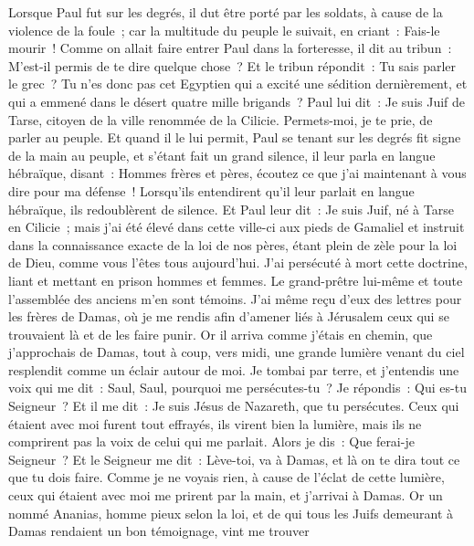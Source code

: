 \begin{multicols}{2}
Lorsque Paul fut sur les degrés, il dut être porté par les soldats, à cause de la violence de la foule~;
car la multitude du peuple le suivait, en criant~: Fais-le mourir~!
Comme on allait faire entrer Paul dans la forteresse, il dit au tribun~: M'est-il permis de te dire quelque chose~? Et le tribun répondit~: Tu sais parler le grec~?
Tu n'es donc pas cet Egyptien qui a excité une sédition dernièrement, et qui a emmené dans le désert quatre mille brigands~?
Paul lui dit~: Je suis Juif de Tarse, citoyen de la ville renommée de la Cilicie. Permets-moi, je te prie, de parler au peuple.
Et quand il le lui permit, Paul se tenant sur les degrés fit signe de la main au peuple, et s'étant fait un grand silence, il leur parla en langue hébraïque, disant~:
\VerseOne{}Hommes frères et pères, écoutez ce que j'ai maintenant à vous dire pour ma défense~!
Lorsqu'ils entendirent qu'il leur parlait en langue hébraïque, ils redoublèrent de silence. Et Paul leur dit~:
Je suis Juif, né à Tarse en Cilicie~; mais j'ai été élevé dans cette ville-ci aux pieds de Gamaliel et instruit dans la connaissance exacte de la loi de nos pères, étant plein de zèle pour la loi de Dieu, comme vous l'êtes tous aujourd'hui.
J'ai persécuté à mort cette doctrine, liant et mettant en prison hommes et femmes.
Le grand-prêtre lui-même et toute l'assemblée des anciens m'en sont témoins. J'ai même reçu d'eux des lettres pour les frères de Damas, où je me rendis afin d'amener liés à Jérusalem ceux qui se trouvaient là et de les faire punir.
Or il arriva comme j'étais en chemin, que j'approchais de Damas, tout à coup, vers midi, une grande lumière venant du ciel resplendit comme un éclair autour de moi.
Je tombai par terre, et j'entendis une voix qui me dit~: Saul, Saul, pourquoi me persécutes-tu~?
Je répondis~: Qui es-tu Seigneur~? Et il me dit~: Je suis Jésus de Nazareth, que tu persécutes.
Ceux qui étaient avec moi furent tout effrayés, ils virent bien la lumière, mais ils ne comprirent pas la voix de celui qui me parlait. Alors je dis~: Que ferai-je Seigneur~?
Et le Seigneur me dit~: Lève-toi, va à Damas, et là on te dira tout ce que tu dois faire.
Comme je ne voyais rien, à cause de l'éclat de cette lumière, ceux qui étaient avec moi me prirent par la main, et j'arrivai à Damas.
Or un nommé Ananias, homme pieux selon la loi, et de qui tous les Juifs demeurant à Damas rendaient un bon témoignage, vint me trouver

\end{multicols}
